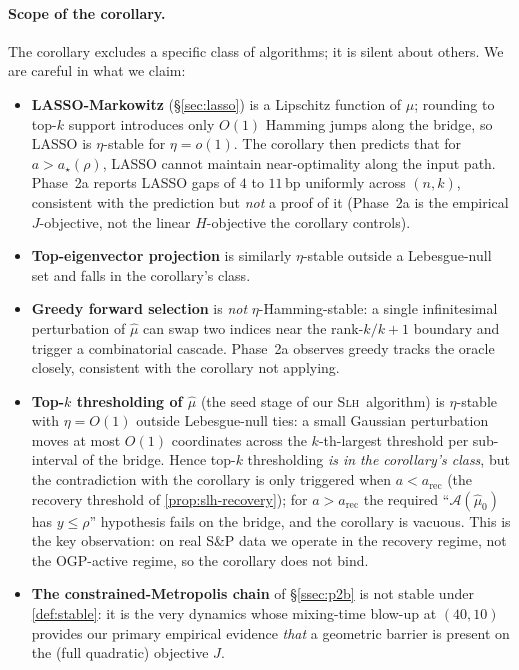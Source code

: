 \paragraph{Scope of the corollary.}
The corollary excludes a specific class of algorithms; it is silent about others. We are
careful in what we claim:
\begin{itemize}\itemsep=2pt
\item \textbf{LASSO-Markowitz} (\S\ref{sec:lasso}) is a Lipschitz function of $\hat\mu$;
rounding to top-$k$ support introduces only $O(1)$ Hamming jumps along the bridge, so
LASSO is $\eta$-stable for $\eta = o(1)$. The corollary then predicts that for
$a>a_\star(\rho)$, LASSO cannot maintain near-optimality along the input path. Phase~2a
reports LASSO gaps of $4$ to $11$\,bp uniformly across $(n,k)$, consistent with the
prediction but \emph{not} a proof of it (Phase~2a is the empirical $J$-objective, not the
linear $H$-objective the corollary controls).

\item \textbf{Top-eigenvector projection} is similarly $\eta$-stable outside a
Lebesgue-null set and falls in the corollary's class.

\item \textbf{Greedy forward selection} is \emph{not} $\eta$-Hamming-stable: a single
infinitesimal perturbation of $\hat\mu$ can swap two indices near the rank-$k/k{+}1$
boundary and trigger a combinatorial cascade. Phase~2a observes greedy tracks the oracle
closely, consistent with the corollary not applying.

\item \textbf{Top-$k$ thresholding of $\hat\mu$} (the seed stage of our \textsc{Slh}\ algorithm)
is $\eta$-stable with $\eta=O(1)$ outside Lebesgue-null ties: a small Gaussian
perturbation moves at most $O(1)$ coordinates across the $k$-th-largest threshold per
sub-interval of the bridge. Hence top-$k$ thresholding \emph{is in the corollary's
class}, but the contradiction with the corollary is only triggered when $a < a_{\mathrm{rec}}$
(the recovery threshold of \cref{prop:slh-recovery}); for $a > a_{\mathrm{rec}}$ the
required ``$\mathcal A(\hat\mu_0)$ has $y\le\rho$'' hypothesis fails on the bridge, and the
corollary is vacuous. This is the key observation: on real S\&P data we operate in the
recovery regime, not the OGP-active regime, so the corollary does not bind.

\item \textbf{The constrained-Metropolis chain} of \S\ref{ssec:p2b} is not stable under
\cref{def:stable}: it is the very dynamics whose mixing-time blow-up at $(40,10)$
provides our primary empirical evidence \emph{that} a geometric barrier is present on
the (full quadratic) objective $J$.
\end{itemize}

